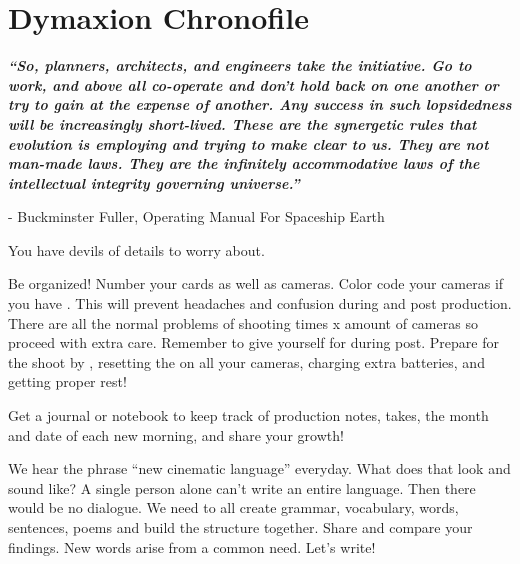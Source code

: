 \section{Dymaxion Chronofile}
\pagecolor{white}
\label{chap:27}
\begin{fullwidth}

{\itshape\bfseries “So, planners, architects, and engineers take the initiative. Go to work, and above all co-operate and don't hold back on one another or try to gain at the expense of another. Any success in such lopsidedness will be increasingly short-lived. These are the synergetic rules that evolution is employing and trying to make clear to us. They are not man-made laws. They are the infinitely accommodative laws of the intellectual integrity governing universe.”}

- Buckminster Fuller, Operating Manual For Spaceship Earth
\vspace{\baselineskip}

\problem

{\large You have devils of details to worry about. \par}

Be organized! Number your cards as well as cameras. Color code your cameras if you have \textbf{}. This will prevent headaches and confusion during \textbf{} and post production. There are all the normal problems of shooting times x amount of cameras so proceed with extra care. Remember to give yourself \textbf{} for \textbf{} during post. Prepare for the shoot by \textbf{}, resetting the \textbf{} on all your cameras, charging extra batteries, and getting proper rest! 

\clearpage
\solution

{\large Get a journal or notebook to keep track of production notes, takes, the month and date of each new morning, and share your growth! \par}

We hear the phrase “new cinematic language” everyday. What does that look and sound like? A single person alone can’t write an entire language. Then there would be no dialogue. We need to all create grammar, vocabulary, words, sentences, poems and build the structure together. Share and compare your findings. New words arise from a common need.  Let’s write!




\clearpage
\end{fullwidth}
